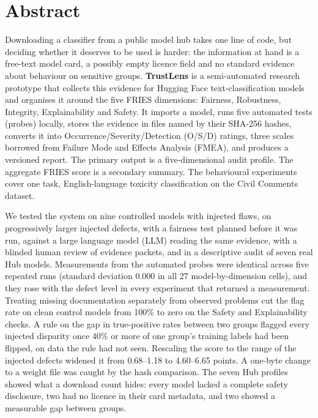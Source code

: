 \newpage
{}\setlength{\parskip}{6pt}\setlength{\parindent}{15pt}
\chapter*{Abstract}
Downloading a classifier from a public model hub takes one line of code, but deciding whether it deserves to be used is harder: the information at hand is a free-text model card, a possibly empty licence field and no standard evidence about behaviour on sensitive groups. \textbf{TrustLens} is a semi-automated research prototype that collects this evidence for Hugging Face text-classification models and organises it around the five FRIES dimensions: Fairness, Robustness, Integrity, Explainability and Safety. It imports a model, runs five automated tests (probes) locally, stores the evidence in files named by their SHA-256 hashes, converts it into Occurrence/Severity/Detection (O/S/D) ratings, three scales borrowed from Failure Mode and Effects Analysis (FMEA), and produces a versioned report. The primary output is a five-dimensional audit profile. The aggregate FRIES score is a secondary summary. The behavioural experiments cover one task, English-language toxicity classification on the Civil Comments dataset.

We tested the system on nine controlled models with injected flaws, on progressively larger injected defects, with a fairness test planned before it was run, against a large language model (LLM) reading the same evidence, with a blinded human review of evidence packets, and in a descriptive audit of seven real Hub models. Measurements from the automated probes were identical across five repeated runs (standard deviation 0.000 in all 27 model-by-dimension cells), and they rose with the defect level in every experiment that returned a measurement. Treating missing documentation separately from observed problems cut the flag rate on clean control models from 100\% to zero on the Safety and Explainability checks. A rule on the gap in true-positive rates between two groups flagged every injected disparity once 40\% or more of one group's training labels had been flipped, on data the rule had not seen. Rescaling the score to the range of the injected defects widened it from 0.68--1.18 to 4.60--6.65 points. A one-byte change to a weight file was caught by the hash comparison. The seven Hub profiles showed what a download count hides: every model lacked a complete safety disclosure, two had no licence in their card metadata, and two showed a measurable gap between groups.


